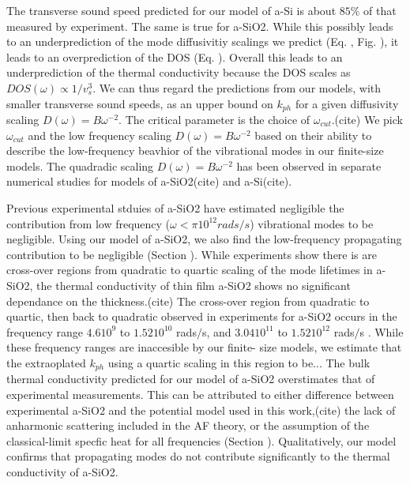 \documentclass[aps,prb,twocolumn,superscriptaddress,footinbib,amsmath,amssymb,floatfix]{revtex4}
\begin{document}
{{The transverse sound speed predicted for our model of 
a-Si is about $85\%$ of that measured by experiment.\cite{liu_high_2009}  
The same is true 
for a-SiO2. While this possibly leads to an underprediction of the 
mode diffusivitiy scalings we predict (Eq. , Fig. ), it leads to an 
overprediction of the DOS (Eq. ). Overall this leads to an underprediction 
of the thermal conductivity because the DOS scales as 
$DOS(\omega)\propto 1/v^3_{s}$. We can thus regard the predictions from 
our models, with smaller transverse sound speeds, 
as an upper bound on $k_{ph}$ for a given diffusivity scaling 
$D(\omega) = B\omega^{-2}$. 
The critical parameter is the choice of $\omega_{cut}$.(cite) 
We pick 
$\omega_{cut}$ and the low frequency scaling $D(\omega) = B\omega^{-2}$ 
based on their ability to describe the low-frequency beavhior 
of the vibrational modes in our finite-size models. The quadradic scaling 
$D(\omega) = B\omega^{-2}$ has been observed in separate numerical studies 
for models of a-SiO2(cite) and a-Si(cite). 

Previous experimental stduies of a-SiO2 have estimated negligible 
the contribution from 
low frequency ($\omega<\pi 10^12 rads/s$)\cite{love_estimate_1990} 
vibrational modes to be negligible. Using our model of a-SiO2, we also 
find the 
low-frequency propagating contribution to be negligible (Section ). 
While experiments show there is are 
cross-over regions from quadratic to quartic scaling of the mode 
lifetimes in a-SiO2, the thermal conductivity of thin film a-SiO2 shows 
no significant dependance on the thickness.(cite) 
The cross-over 
region from quadratic to quartic, then back to quadratic 
observed in experiments for  
a-SiO2 occurs in the frequency range $4.6 10^9$ to 
$1.52 10^{10}$ rads$/$s,\cite{masciovecchio_evidence_2006} 
and $3.04 10^11$ to 
$1.52 10^{12}$ rads$/$s
\cite{baldi_emergence_2013}. 
While these frequency ranges are inaccesible by our finite-
size models, we estimate that the extraoplated $k_{ph}$ using a quartic 
scaling in this region to be... 
The bulk thermal conductivity predicted for our model of a-SiO2 overstimates 
that of experimental measurements.\cite{regner_broadband_2013} This can be 
attributed to either difference between experimental a-SiO2 and the 
potential model used in this work,(cite) the lack of anharmonic scattering 
included in the AF theory,\cite{feldman_thermal_1993} or the assumption 
of the classical-limit specfic heat for all frequencies (Section ). Qualitatively, 
our model confirms that propagating modes do not contribute significantly 
to the thermal conductivity of a-SiO2.
 
}}
\end{document}
